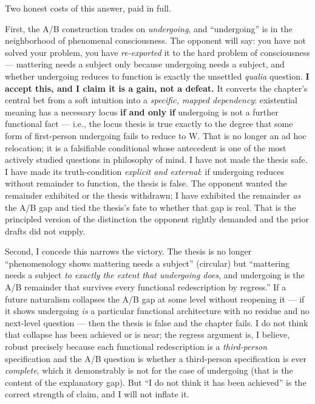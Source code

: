 \documentclass[11pt]{article}
\begin{document}
Two honest costs of this answer, paid in full.

First, the A/\allowbreak{}B construction trades on \emph{undergoing}, and ``undergoing'' is in the neighborhood of phenomenal consciousness. The opponent will say: you have not solved your problem, you have \emph{re-exported} it to the hard problem of consciousness — mattering needs a subject only because undergoing needs a subject, and whether undergoing reduces to function is exactly the unsettled \emph{qualia} question. \textbf{I accept this, and I claim it is a gain, not a defeat.} It converts the chapter's central bet from a soft intuition into a \emph{specific, mapped dependency}: existential meaning has a necessary locus \textbf{if and only if} undergoing is not a further functional fact — i.e., the locus thesis is true exactly to the degree that some form of first-person undergoing fails to reduce to W. That is no longer an ad hoc relocation; it is a falsifiable conditional whose antecedent is one of the most actively studied questions in philosophy of mind. I have not made the thesis safe. I have made its truth-condition \emph{explicit and external}: if undergoing reduces without remainder to function, the thesis is false. The opponent wanted the remainder exhibited or the thesis withdrawn; I have exhibited the remainder \emph{as} the A/\allowbreak{}B gap and tied the thesis's fate to whether that gap is real. That is the principled version of the distinction the opponent rightly demanded and the prior drafts did not supply.

Second, I concede this narrows the victory. The thesis is no longer ``phenomenology shows mattering needs a subject'' (circular) but ``mattering needs a subject \emph{to exactly the extent that undergoing does}, and undergoing is the A/\allowbreak{}B remainder that survives every functional redescription by regress.'' If a future naturalism collapses the A/\allowbreak{}B gap at some level without reopening it — if it shows undergoing \emph{is} a particular functional architecture with no residue and no next-level question — then the thesis is false and the chapter fails. I do not think that collapse has been achieved or is near; the regress argument is, I believe, robust precisely because each functional redescription is a \emph{third-person} specification and the A/\allowbreak{}B question is whether a third-person specification is ever \emph{complete}, which it demonstrably is not for the case of undergoing (that is the content of the explanatory gap). But ``I do not think it has been achieved'' is the correct strength of claim, and I will not inflate it.
\end{document}
